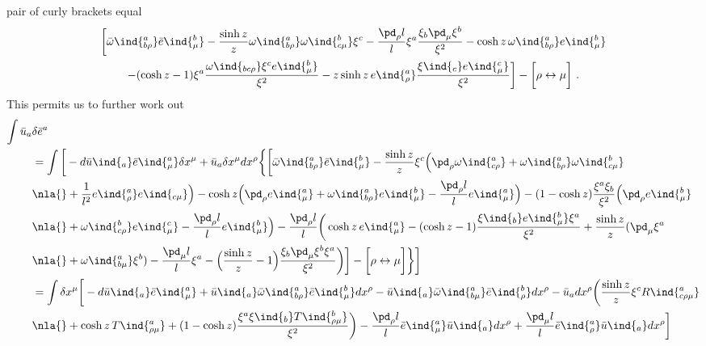 \documentclass[11pt]{article}
\begin{document}
pair of curly brackets equal
\begin{multline*}
	\bigg[ \bar{\omega}\ind{^a_{b\rho}} \bar{e}\ind{^b_\mu} - 
	\frac{\sinh z}{z} \omega\ind{^a_{b\rho}} \omega\ind{^b_{c\mu}} 
	\xi^c - \frac{\pd_\rho l}{l} \xi^a \frac{\xi_b \pd_\mu 
		\xi^b}{\xi^2} - \cosh z\, \omega\ind{^a_{b\rho}} 
	e\ind{^b_\mu}
	\\
	- (\cosh z - 1) \xi^a \frac{\omega\ind{_{bc\rho}} \xi^c 
		e\ind{^b_\mu}}{\xi^2} - z \sinh z\, e\ind{^a_\rho} 
	\frac{\xi\ind{_c} e\ind{^c_\mu}}{\xi^2} \bigg] - \bigg[ \rho 
	\leftrightarrow \mu \bigg]~.
\end{multline*}
This permits us to further work out
\begin{displaymath}
\begin{split}
	\int \bar{u}_a &\delta\bar{e}^a \\
	&= \int \bigg[ -d\bar{u}\ind{_a} \bar{e}\ind{^a_\mu} \delta 
	x^\mu + \bar{u}_a \delta x^\mu dx^\rho \bigg\{ \bigg[ 
	\bar{\omega}\ind{^a_{b\rho}} \bar{e}\ind{^b_\mu} - \frac{\sinh 
		z}{z} \xi^c \Big( \pd_\rho \omega\ind{^a_{c\rho}} + 
	\omega\ind{^a_{b\rho}} \omega\ind{^b_{c\mu}}
	\\
	&\nla{} + \frac{1}{l^2} e\ind{^a_\rho} e\ind{_{c\mu}} \Big) - 
	\cosh z \Big( \pd_\rho e\ind{^a_\mu} + \omega\ind{^a_{b\rho}} 
	e\ind{^b_\mu} - \frac{\pd_\rho l}{l} e\ind{^a_\mu} \Big) - (1 
	- \cosh z) \frac{\xi^a \xi_b}{\xi^2} \Big( \pd_\rho 
	e\ind{^b_\mu}
	\\
	&\nla{} + \omega\ind{^b_{c\rho}} e\ind{^c_\mu} - 
	\frac{\pd_\rho l}{l} e\ind{^b_\mu} \Big) - \frac{\pd_\rho 
		l}{l} \bigg( \cosh z\, e\ind{^a_\mu} - (\cosh z - 1) 
	\frac{\xi\ind{_b} e\ind{^b_\mu} \xi^a}{\xi^2} + \frac{\sinh 
		z}{z}(\pd_\mu \xi^a
	\\
	&\nla{} + \omega\ind{^a_{b\mu}} \xi^b)- \frac{\pd_\mu l}{l} 
	\xi^a - \Big( \frac{\sinh z}{z} - 1 \Big) \frac{\xi_b \pd_\mu 
		\xi^b \xi^a}{\xi^2} \bigg) \bigg] - \bigg[ \rho 
	\leftrightarrow \mu \bigg] \bigg\} \bigg]
	\\
	&= \int \delta x^\mu \bigg[ -d\bar{u}\ind{_a} 
	\bar{e}\ind{^a_\mu} + \bar{u}\ind{_a} 
	\bar{\omega}\ind{^a_{b\rho}} \bar{e}\ind{^b_\mu} dx^\rho - 
	\bar{u}\ind{_a} \bar{\omega}\ind{^a_{b\mu}} 
	\bar{e}\ind{^b_\rho} dx^\rho - \bar{u}_a dx^\rho \bigg( 
		\frac{\sinh z}{z} \xi^c R\ind{^a_{c\rho\mu}}
	\\
	&\nla{} + \cosh z\, T\ind{^a_{\rho\mu}} + (1 - \cosh z) 
	\frac{\xi^a \xi\ind{_b} T\ind{^b_{\rho\mu}}}{\xi^2} \bigg) - 
	\frac{\pd_\rho l}{l} \bar{e}\ind{^a_\mu} \bar{u}\ind{_a} 
	dx^\rho + \frac{\pd_\mu l}{l} \bar{e}\ind{^a_\rho} 
	\bar{u}\ind{_a} dx^\rho \bigg]
\end{split}
\end{displaymath}
\end{document}
